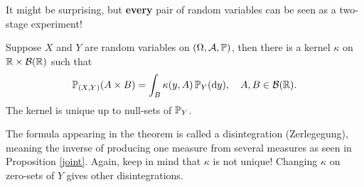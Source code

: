 It might be surprising, but \textbf{every} pair of random variables can be seen as a two-stage experiment!
\begin{lsuperwichtigersatz}
\begin{theorem}\label{kernel}
	Suppose $X$ and $Y$ are random variables on $(\Omega, \mathcal A, \P)$, then there is a kernel $\kappa$ on $\R\times \mathcal B(\R)$ such that
	\begin{align}\label{main2}
		\P_{(X,Y)}(A\times B)=\int_B \kappa(y,A) \,\P_Y(\mathrm d y),\quad A, B\in \mathcal B(\R).
	\end{align}
	The kernel is unique up to null-sets of $\P_Y$.
\end{theorem}
\end{lsuperwichtigersatz}
The formula appearing in the theorem is called a disintegration (\glq Zerlegegung\grq), meaning the inverse of producing one measure from several measures as seen in Proposition \ref{joint}. Again, keep in mind that $\kappa$ is not unique! Changing $\kappa$ on zero-sets of $Y$ gives other disintegrations. 
